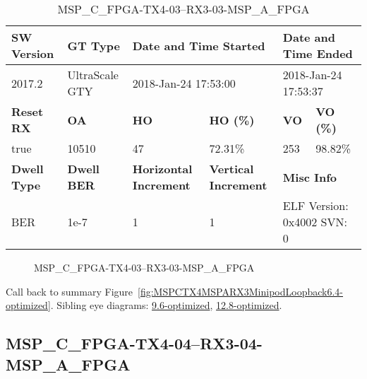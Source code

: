 \begin{table}[h]
\centering
\caption{MSP\_C\_FPGA-TX4-03--RX3-03-MSP\_A\_FPGA}
\label{tab:MSPCFPGATX403RX303MSPAFPGA6.4-optimized}
\begin{tabular}{@{}|l|l|l|l|l|l|@{}}
\toprule
\textbf{SW Version}                & \textbf{GT Type}   & \multicolumn{2}{l|}{\textbf{Date and Time Started}}            & \multicolumn{2}{l|}{\textbf{Date and Time Ended}}        \\ \midrule
2017.2                       & UltraScale GTY          & \multicolumn{2}{l|}{2018-Jan-24 17:53:00}                   & \multicolumn{2}{l|}{2018-Jan-24 17:53:37}               \\ \midrule
\textbf{Reset RX}                  & \textbf{OA} & \textbf{HO}   & \textbf{HO (\%)} & \textbf{VO} & \textbf{VO (\%)} \\ \midrule
true & 10510        & 47          & 72.31\%        & 253        & 98.82\%       \\ \midrule
\textbf{Dwell Type}                & \textbf{Dwell BER} & \textbf{Horizontal Increment} & \textbf{Vertical Increment}    & \multicolumn{2}{l|}{\textbf{Misc Info}}                  \\ \midrule
BER                            & 1e-7        & 1        & 1           & \multicolumn{2}{l|}{ELF Version: 0x4002 SVN: 0}                         \\ \bottomrule
\end{tabular}
\end{table}

\begin{figure}[h]
\caption{MSP\_C\_FPGA-TX4-03--RX3-03-MSP\_A\_FPGA} \label{fig:MSPCFPGATX403RX303MSPAFPGA6.4-optimized}
\end{figure}

Call back to summary Figure~\ref{fig:MSPCTX4MSPARX3MinipodLoopback6.4-optimized}.
Sibling eye diagrams: \hyperref[sec:MSPCFPGATX403RX303MSPAFPGA9.6-optimized]{9.6-optimized}, \hyperref[sec:MSPCFPGATX403RX303MSPAFPGA12.8-optimized]{12.8-optimized}.

\clearpage
\newpage


\subsection{MSP\_C\_FPGA-TX4-04--RX3-04-MSP\_A\_FPGA}\label{sec:MSPCFPGATX404RX304MSPAFPGA6.4-optimized}

